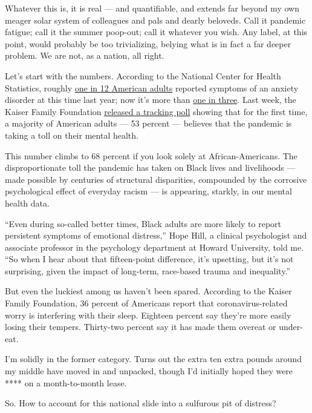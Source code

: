 Whatever this is, it is real --- and quantifiable, and extends far
beyond my own meager solar system of colleagues and pals and dearly
beloveds. Call it pandemic fatigue; call it the summer poop-out; call it
whatever you wish. Any label, at this point, would probably be too
trivializing, belying what is in fact a far deeper problem. We are not,
as a nation, all right.

Let's start with the numbers. According to the National Center for
Health Statistics, roughly
\href{https://www.cdc.gov/nchs/data/nhis/earlyrelease/ERmentalhealth-508.pdf}{one
in 12 American adults} reported symptoms of an anxiety disorder at this
time last year; now it's more than
\href{https://www.cdc.gov/nchs/covid19/pulse/mental-health.htm}{one in
three}. Last week, the Kaiser Family Foundation
\href{https://www.kff.org/coronavirus-covid-19/report/kff-health-tracking-poll-july-2020/}{released
a tracking poll} showing that for the first time, a majority of American
adults --- 53 percent --- believes that the pandemic is taking a toll on
their mental health.

This number climbs to 68 percent if you look solely at
African-Americans. The disproportionate toll the pandemic has taken on
Black lives and livelihoods --- made possible by centuries of structural
disparities, compounded by the corrosive psychological effect of
everyday racism --- is appearing, starkly, in our mental health data.

``Even during so-called better times, Black adults are more likely to
report persistent symptoms of emotional distress,'' Hope Hill, a
clinical psychologist and associate professor in the psychology
department at Howard University, told me. ``So when I hear about that
fifteen-point difference, it's upsetting, but it's not surprising, given
the impact of long-term, race-based trauma and inequality.''

But even the luckiest among us haven't been spared. According to the
Kaiser Family Foundation, 36 percent of Americans report that
coronavirus-related worry is interfering with their sleep. Eighteen
percent say they're more easily losing their tempers. Thirty-two percent
say it has made them overeat or under-eat.

I'm solidly in the former category. Turns out the extra ten extra pounds
around my middle have moved in and unpacked, though I'd initially hoped
they were **** on a month-to-month lease.

So. How to account for this national slide into a sulfurous pit of
distress?

